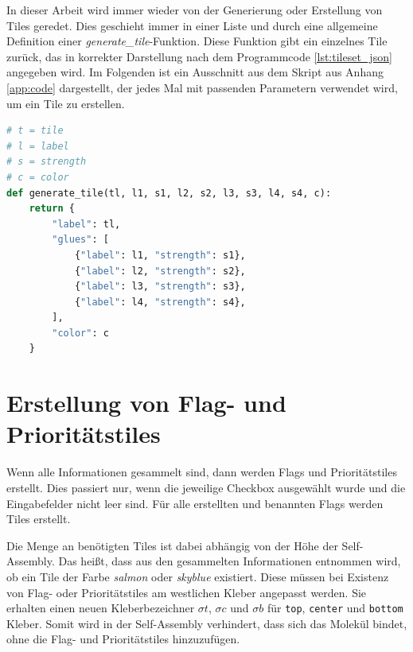 In dieser Arbeit wird immer wieder von der Generierung oder Erstellung von Tiles geredet. Dies geschieht immer in einer Liste und durch eine allgemeine Definition einer \emph{generate\_tile}-Funktion. Diese Funktion gibt ein einzelnes Tile zurück, das in korrekter Darstellung nach dem Programmcode \ref{lst:tileset_json} angegeben wird. Im Folgenden ist ein Ausschnitt aus dem Skript aus Anhang \ref{app:code}  dargestellt, der jedes Mal mit passenden Parametern verwendet wird, um ein Tile zu erstellen.

\begin{lstlisting}[language=python, caption={[Codeausschnitt der \texttt{generate\_tile}-Funktion]{Die zentrale Funktion des Skriptes, mit welcher ein einzelnes Tile generiert werden kann. In \texttt{label} wird der Tilebezeichner gespeichert, im \texttt{glues}-Array die nördlichen, östlichen, südlichen und westlichen Kleber mit Bezeichner und Stärke. Dabei liegen sie auch in dieser Reihenfolge vor. Zuletzt kann noch die Füllfarbe des Tiles angegeben werden.}}, label=lst:generate_tile]
# t = tile
# l = label
# s = strength
# c = color
def generate_tile(tl, l1, s1, l2, s2, l3, s3, l4, s4, c):
    return {
        "label": tl,
        "glues": [
            {"label": l1, "strength": s1},
            {"label": l2, "strength": s2},
            {"label": l3, "strength": s3},
            {"label": l4, "strength": s4},
        ],
        "color": c
    }
\end{lstlisting}

\section{Erstellung von Flag- und Prioritätstiles}

Wenn alle Informationen gesammelt sind, dann werden Flags und Prioritätstiles erstellt. Dies passiert nur, wenn die jeweilige Checkbox ausgewählt wurde und die Eingabefelder nicht leer sind. Für alle erstellten und benannten Flags werden Tiles erstellt. 

Die Menge an benötigten Tiles ist dabei abhängig von der Höhe der Self-Assembly. Das heißt, dass aus den gesammelten Informationen entnommen wird, ob ein Tile der Farbe \emph{salmon} oder \emph{skyblue} existiert.
Diese müssen bei Existenz von Flag- oder Prioritätstiles am westlichen Kleber angepasst werden. Sie erhalten einen neuen Kleberbezeichner $\sigma t$, $\sigma c$ und $\sigma b$ für \texttt{top}, \texttt{center} und \texttt{bottom} Kleber. Somit wird in der Self-Assembly verhindert, dass sich das Molekül bindet, ohne die Flag- und Prioritätstiles hinzuzufügen. 

